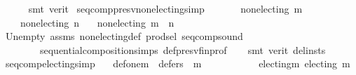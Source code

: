 \begin{isabellebody}
\ \ \ \ \isamarkupfalse%
\ {\isacharparenleft}{\kern0pt}smt\ {\isacharparenleft}{\kern0pt}verit{\isacharparenright}{\kern0pt}{\isacharparenright}{\kern0pt}\isanewline
{}\isamarkupfalse%
%
\endisatagproof
{\isafoldproof}%
%
\isadelimproof
\isanewline
%
\endisadelimproof
\isanewline
\isanewline
{}\isamarkupfalse%
\ seq{\isacharunderscore}{\kern0pt}comp{\isacharunderscore}{\kern0pt}presv{\isacharunderscore}{\kern0pt}non{\isacharunderscore}{\kern0pt}electing{\isacharbrackleft}{\kern0pt}simp{\isacharbrackright}{\kern0pt}{\isacharcolon}{\kern0pt}\isanewline
\ \ \isanewline
\ \ \ \ {\isachardoublequoteopen}non{\isacharunderscore}{\kern0pt}electing\ m{\isachardoublequoteclose}\ \isanewline
\ \ \ \ {\isachardoublequoteopen}non{\isacharunderscore}{\kern0pt}electing\ n{\isachardoublequoteclose}\isanewline
\ \ \ {\isachardoublequoteopen}non{\isacharunderscore}{\kern0pt}electing\ {\isacharparenleft}{\kern0pt}m\ {\isasymtriangleright}\ n{\isacharparenright}{\kern0pt}{\isachardoublequoteclose}\isanewline
%
\isadelimproof
\ \ %
\endisadelimproof
%
\isatagproof
{}\isamarkupfalse%
\ Un{\isacharunderscore}{\kern0pt}empty\ assms\ non{\isacharunderscore}{\kern0pt}electing{\isacharunderscore}{\kern0pt}def\ prod{\isachardot}{\kern0pt}sel\ seq{\isacharunderscore}{\kern0pt}comp{\isacharunderscore}{\kern0pt}sound\isanewline
\ \ \ \ \ \ \ \ sequential{\isacharunderscore}{\kern0pt}composition{\isachardot}{\kern0pt}simps\ def{\isacharunderscore}{\kern0pt}presv{\isacharunderscore}{\kern0pt}fin{\isacharunderscore}{\kern0pt}prof\isanewline
\ \ \isamarkupfalse%
\ {\isacharparenleft}{\kern0pt}smt\ {\isacharparenleft}{\kern0pt}verit{\isacharcomma}{\kern0pt}\ del{\isacharunderscore}{\kern0pt}insts{\isacharparenright}{\kern0pt}{\isacharparenright}{\kern0pt}%
\endisatagproof
{\isafoldproof}%
%
\isadelimproof
\isanewline
%
\endisadelimproof
\isanewline
\isanewline
{}\isamarkupfalse%
\ seq{\isacharunderscore}{\kern0pt}comp{\isacharunderscore}{\kern0pt}electing{\isacharbrackleft}{\kern0pt}simp{\isacharbrackright}{\kern0pt}{\isacharcolon}{\kern0pt}\isanewline
\ \ \ def{\isacharunderscore}{\kern0pt}one{\isacharunderscore}{\kern0pt}m{}{\isacharcolon}{\kern0pt}\ \ {\isachardoublequoteopen}defers\ {}\ m{}{\isachardoublequoteclose}\ \isanewline
\ \ \ \ \ \ \ \ \ \ electing{\isacharunderscore}{\kern0pt}m{}{\isacharcolon}{\kern0pt}\ {\isachardoublequoteopen}electing\ m{}{\isachardoublequoteclose}\isanewline

\end{isabellebody}
